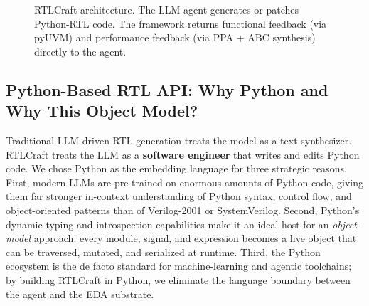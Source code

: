 \documentclass[11pt]{article}
\begin{document}
\begin{figure}[htbp]
\centering
{}
\caption{RTLCraft architecture. The LLM agent generates or patches Python-RTL code. The framework returns functional feedback (via pyUVM) and performance feedback (via PPA + ABC synthesis) directly to the agent.}
\label{fig:architecture}
\end{figure}

\subsection{Python-Based RTL API: Why Python and Why This Object Model?}
\label{sec:api}

Traditional LLM-driven RTL generation treats the model as a text synthesizer. RTLCraft treats the LLM as a \textbf{software engineer} that writes and edits Python code. We chose Python as the embedding language for three strategic reasons. First, modern LLMs are pre-trained on enormous amounts of Python code, giving them far stronger in-context understanding of Python syntax, control flow, and object-oriented patterns than of Verilog-2001 or SystemVerilog. Second, Python's dynamic typing and introspection capabilities make it an ideal host for an \textit{object-model} approach: every module, signal, and expression becomes a live object that can be traversed, mutated, and serialized at runtime. Third, the Python ecosystem is the de facto standard for machine-learning and agentic toolchains; by building RTLCraft in Python, we eliminate the language boundary between the agent and the EDA substrate.
\end{document}
